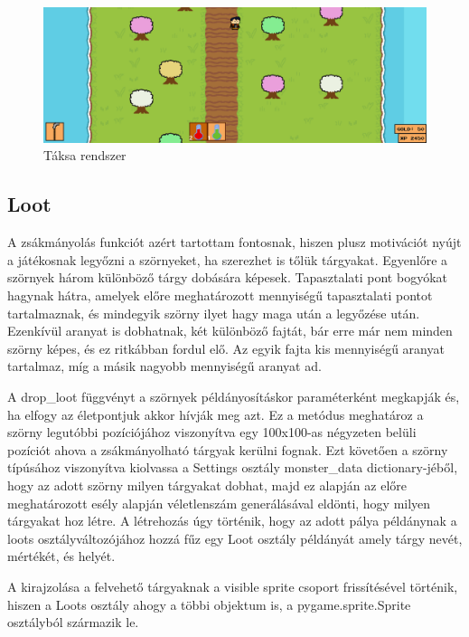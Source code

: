\begin{figure}[H]
    \centering
    \includegraphics[width=15.5truecm]{images/inventory.png}
    \caption{Táksa rendszer}
    \label{fig:Táska rendszer}
\end{figure}

\subsection{Loot}

A zsákmányolás funkciót azért tartottam fontosnak, hiszen plusz motivációt nyújt a játékosnak legyőzni a szörnyeket, ha szerezhet is tőlük tárgyakat. Egyenlőre a szörnyek három különböző tárgy dobására képesek. Tapasztalati pont bogyókat hagynak hátra, amelyek előre meghatározott mennyiségű tapasztalati pontot tartalmaznak, és mindegyik szörny ilyet hagy maga után a legyőzése után. Ezenkívül aranyat is dobhatnak, két különböző fajtát, bár erre már nem minden szörny képes, és ez ritkábban fordul elő. Az egyik fajta kis mennyiségű aranyat tartalmaz, míg a másik nagyobb mennyiségű aranyat ad. 

A drop\_loot függvényt a szörnyek példányosításkor paraméterként megkapják és, ha elfogy az életpontjuk akkor hívják meg azt. Ez a metódus meghatároz a szörny legutóbbi pozíciójához viszonyítva egy 100x100-as négyzeten belüli pozíciót ahova a zsákmányolható tárgyak kerülni fognak. Ezt követően a szörny típúsához viszonyítva kiolvassa a Settings osztály monster\_data dictionary-jéből, hogy az adott szörny milyen tárgyakat dobhat, majd ez alapján az előre meghatározott esély alapján véletlenszám generálásával eldönti, hogy milyen tárgyakat hoz létre. A létrehozás úgy történik, hogy az adott pálya példánynak a loots osztályváltozójához hozzá fűz egy Loot osztály példányát amely tárgy nevét, mértékét, és helyét.

A kirajzolása a felvehető tárgyaknak a visible sprite csoport frissítésével történik, hiszen a Loots osztály ahogy a többi objektum is, a pygame.sprite.Sprite osztályból származik le.  

